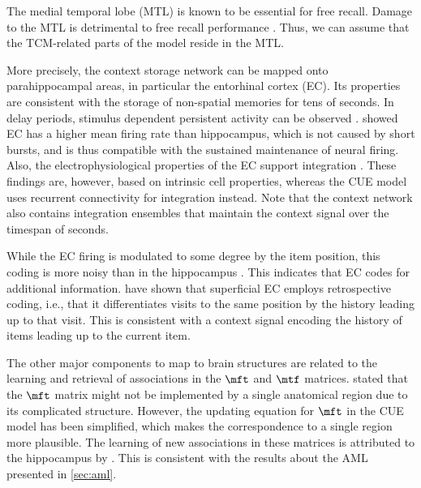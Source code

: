 The medial temporal lobe (MTL) is known to be essential for free recall.
Damage to the MTL is detrimental to free recall performance \parencite{graf1984}.
Thus, we can assume that the TCM-related parts of the model reside in the MTL\@.

More precisely, the context storage network can be mapped  onto parahippocampal areas, in particular the entorhinal cortex (EC).
Its properties are consistent with the storage of non-spatial memories for tens of seconds.
In delay periods, stimulus dependent persistent activity can be observed \parencite{suzuki1997,young1997}.
\Textcite{quirk1992} showed EC has a higher mean firing rate than hippocampus, which is not caused by short bursts, and is thus compatible with the sustained maintenance of neural firing.
Also, the electrophysiological properties of the EC support integration \parencite{egorov2002}.
These findings are, however, based on intrinsic cell properties, whereas the CUE model uses recurrent connectivity for integration instead.
Note that the context network also contains integration ensembles that maintain the context signal over the timespan of seconds.

While the EC firing is modulated to some degree by the item position, this coding is more noisy than in the hippocampus \parencite{quirk1992}.
This indicates that EC codes for additional information.
\Textcite{Frank2000} have shown that superficial EC employs retrospective coding, i.e., that it differentiates visits to the same position by the history leading up to that visit.
This is consistent with a context signal encoding the history of items leading up to the current item.

The other major components to map to brain structures are related to the learning and retrieval of associations in the $\mft$ and $\mtf$ matrices.
\Textcite{howard2005} stated that the $\mft$ matrix might not be implemented by a single anatomical region due to its complicated structure.
However, the updating equation for $\mft$ in the CUE model has been simplified, which makes the correspondence to a single region more plausible.
The learning of new associations in these matrices is attributed to the hippocampus by \textcite{howard2005}.
This is consistent with the results about the AML presented in \cref{sec:aml}.


